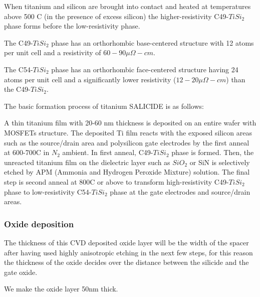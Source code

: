 When titanium and silicon are brought into contact and heated at temperatures above 500 \degree C (in the presence of excess silicon) the higher-resistivity C49-$TiSi_2$ phase forms before the low-resistivity phase.

The C49-$TiSi_2$ phase has an orthorhombic base-centered structure with 12 atoms per unit cell and a resistivity of $60-90 \mu\Omega - cm$.

The C54-$TiSi_2$ phase has an orthorhombic face-centered structure having 24 atoms per unit cell and a significantly lower resistivity ($12-20 \mu\Omega - cm$) than the C49-$TiSi_2$.

The basic formation process of titanium SALICIDE is as follows:

A thin titanium film with 20-60 nm thickness is deposited on an entire wafer with MOSFETs structure.
The deposited Ti film reacts with the exposed silicon areas such as the source/drain area and polysilicon gate electrodes by the first anneal at 600-700\degree C in $N_2$ ambient. In first anneal, C49-$TiSi_2$ phase is formed.
Then, the unreacted titanium film on the dielectric layer such as $SiO_2$ or SiN is selectively etched by APM (Ammonia and Hydrogen Peroxide Mixture) solution.
The final step is second anneal at 800\degree C or above to transform high-resistivity C49-$TiSi_2$ phase to low-resistivity C54-$TiSi_2$ phase at the gate electrodes and source/drain areas.

\newpage

\subsubsection{Oxide deposition}

The thickness of this CVD deposited oxide layer will be the width of the spacer after having used highly anisotropic etching in the next few steps, for this reason the thickness of the oxide decides over the distance between the silicide and the gate oxide.

We make the oxide layer 50nm thick.

